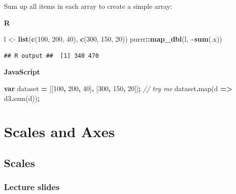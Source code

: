 \documentclass[
  openany]{book}
\newenvironment{Shaded}{\begin{snugshade}}{\end{snugshade}}
\newcommand{\CommentTok}[1]{\textcolor[rgb]{0.56,0.35,0.01}{\textit{#1}}}
\newcommand{\DecValTok}[1]{\textcolor[rgb]{0.00,0.00,0.81}{#1}}
\newcommand{\FunctionTok}[1]{\textcolor[rgb]{0.00,0.00,0.00}{#1}}
\newcommand{\KeywordTok}[1]{\textcolor[rgb]{0.13,0.29,0.53}{\textbf{#1}}}
\newcommand{\NormalTok}[1]{#1}
\newcommand{\OperatorTok}[1]{\textcolor[rgb]{0.81,0.36,0.00}{\textbf{#1}}}
\newcommand{\StringTok}[1]{\textcolor[rgb]{0.31,0.60,0.02}{#1}}
\begin{document}
Sum up all items in each array to create a simple array:

\textbf{R}

\begin{Shaded}
\begin{Highlighting}[]
\NormalTok{l \textless{}{-}}\StringTok{ }\KeywordTok{list}\NormalTok{(}\KeywordTok{c}\NormalTok{(}\DecValTok{100}\NormalTok{, }\DecValTok{200}\NormalTok{, }\DecValTok{40}\NormalTok{), }\KeywordTok{c}\NormalTok{(}\DecValTok{300}\NormalTok{, }\DecValTok{150}\NormalTok{, }\DecValTok{20}\NormalTok{))}
\NormalTok{purrr}\OperatorTok{::}\KeywordTok{map\_dbl}\NormalTok{(l, }\OperatorTok{\textasciitilde{}}\KeywordTok{sum}\NormalTok{(.x))}
\end{Highlighting}
\end{Shaded}

\begin{verbatim}
## R output ##  [1] 340 470
\end{verbatim}

\textbf{JavaScript}

\begin{Shaded}
\begin{Highlighting}[]
\KeywordTok{var}\NormalTok{ dataset }\OperatorTok{=}\NormalTok{ [[}\DecValTok{100}\OperatorTok{,} \DecValTok{200}\OperatorTok{,} \DecValTok{40}\NormalTok{]}\OperatorTok{,}\NormalTok{ [}\DecValTok{300}\OperatorTok{,} \DecValTok{150}\OperatorTok{,} \DecValTok{20}\NormalTok{]]}\OperatorTok{;}     \CommentTok{// try me}
\NormalTok{dataset}\OperatorTok{.}\FunctionTok{map}\NormalTok{(d }\KeywordTok{=\textgreater{}}\NormalTok{ d3}\OperatorTok{.}\FunctionTok{sum}\NormalTok{(d))}\OperatorTok{;}
\end{Highlighting}
\end{Shaded}

\hypertarget{scales-and-axes}{%
\chapter{\texorpdfstring{Scales and Axes }{Scales and Axes }}\label{scales-and-axes}}

\hypertarget{scales}{%
\section{Scales}\label{scales}}

\hypertarget{lecture-slides-1}{%
\subsection{\texorpdfstring{Lecture slides }{Lecture slides }}\label{lecture-slides-1}}
\end{document}

